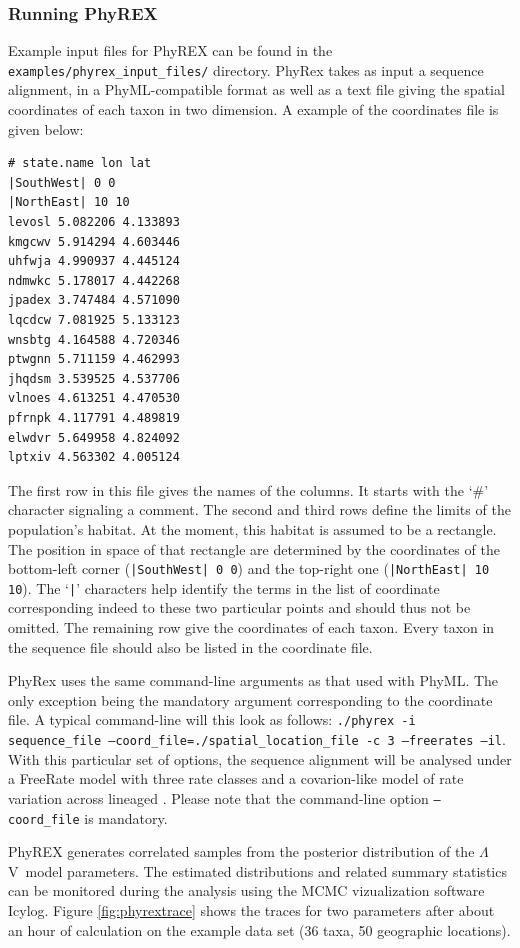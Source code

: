 \documentclass[a4paper,12pt]{article}
\newcommand{\x}[1]{\texttt{#1}}
\newcommand{\sfv}{$\Lambda$V}
\begin{document}
\subsubsection{Running PhyREX}

Example input files for PhyREX can be found in the \x{examples/phyrex\_input\_files/} directory.
PhyRex takes as input a sequence alignment, in a PhyML-compatible format as well as a text file
giving the spatial coordinates of each taxon in two dimension. A example of the coordinates file is given
below:
\begin{Verbatim}[frame=single, label=Valid PhyRex spatial location file, samepage=true, baselinestretch=0.5]
# state.name lon lat
|SouthWest| 0 0
|NorthEast| 10 10 
levosl 5.082206 4.133893 
kmgcwv 5.914294 4.603446 
uhfwja 4.990937 4.445124 
ndmwkc 5.178017 4.442268 
jpadex 3.747484 4.571090 
lqcdcw 7.081925 5.133123 
wnsbtg 4.164588 4.720346 
ptwgnn 5.711159 4.462993 
jhqdsm 3.539525 4.537706 
vlnoes 4.613251 4.470530 
pfrnpk 4.117791 4.489819 
elwdvr 5.649958 4.824092 
lptxiv 4.563302 4.005124 
\end{Verbatim}
The first row in this file gives the names of the columns. It starts with the `\#' character signaling a
comment. The second and third rows define the limits of the population's habitat. At the
moment, this habitat is assumed to be a rectangle. The position in space of that rectangle are
determined by the coordinates of the bottom-left corner (\x{|SouthWest| 0 0}) and the top-right
one (\x{|NorthEast| 10 10}). The `\x{|}' characters help  identify the terms in the list of coordinate
corresponding indeed to these two particular points and should thus not be omitted. The remaining
row give the coordinates of each taxon. Every taxon in the sequence file should also be listed in
the coordinate file.

PhyRex uses the same command-line arguments as that used with PhyML. The only exception being the
mandatory argument corresponding to the coordinate file. A typical command-line will this look as
follows: \x{./phyrex -i sequence\_file --coord\_file=./spatial\_location\_file -c 3 --freerates
  --il}. With this particular set of options, the sequence alignment will be analysed under a
FreeRate  model \cite{soubrier12} with three rate classes and a covarion-like model of rate variation
across lineaged \cite{guindon13}. Please note that the command-line option \x{--coord\_file} is mandatory.

PhyREX generates correlated samples from the posterior distribution of the \sfv\ model
parameters. The estimated distributions and related summary statistics can be monitored during the
analysis using the MCMC vizualization software Icylog. Figure \ref{fig:phyrextrace} shows the traces
for two parameters after about an hour of calculation on the example data set (36 taxa, 50
geographic locations).
\end{document}
